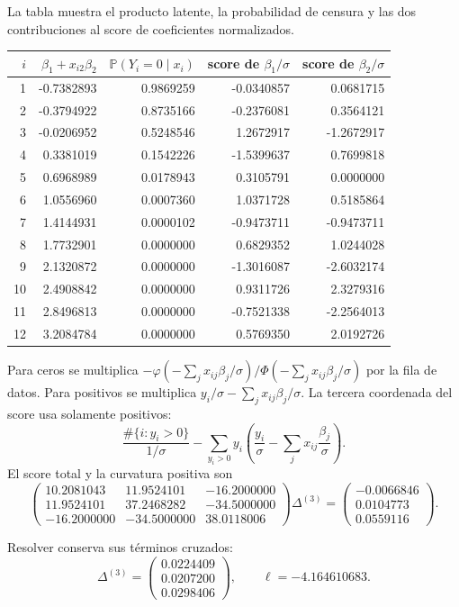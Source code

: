 \documentclass[11pt,a4paper]{article}
\newcommand{\Prob}{\mathbb P}
\begin{document}
La tabla muestra el producto latente,
la probabilidad de censura y
las dos contribuciones al score
de coeficientes normalizados.
\begin{center}\small\begin{tabular}{rrrrr}\toprule
\(i\)&\(\beta_1+x_{i2}\beta_2\)&\(\Prob(Y_i=0\mid x_i)\)&score de \(\beta_1/\sigma\)&score de \(\beta_2/\sigma\)\\\midrule
1&-0.7382893&0.9869259&-0.0340857&0.0681715\\
2&-0.3794922&0.8735166&-0.2376081&0.3564121\\
3&-0.0206952&0.5248546&1.2672917&-1.2672917\\
4&0.3381019&0.1542226&-1.5399637&0.7699818\\
5&0.6968989&0.0178943&0.3105791&0.0000000\\
6&1.0556960&0.0007360&1.0371728&0.5185864\\
7&1.4144931&0.0000102&-0.9473711&-0.9473711\\
8&1.7732901&0.0000000&0.6829352&1.0244028\\
9&2.1320872&0.0000000&-1.3016087&-2.6032174\\
10&2.4908842&0.0000000&0.9311726&2.3279316\\
11&2.8496813&0.0000000&-0.7521338&-2.2564013\\
12&3.2084784&0.0000000&0.5769350&2.0192726\\\bottomrule\end{tabular}\end{center}
Para ceros se multiplica
\(-\varphi(-\sum_jx_{ij}\beta_j/\sigma)/
\Phi(-\sum_jx_{ij}\beta_j/\sigma)\)
por la fila de datos.
Para positivos se multiplica
\(y_i/\sigma-\sum_jx_{ij}\beta_j/\sigma\).
La tercera coordenada del score
usa solamente positivos:
\[
\frac{\#\{i:y_i>0\}}{1/\sigma}
-\sum_{y_i>0}y_i\left(\frac{y_i}{\sigma}
-\sum_jx_{ij}\frac{\beta_j}{\sigma}\right).
\]
El score total y la curvatura positiva son
\[
\begin{pmatrix}10.2081043&11.9524101&-16.2000000\\11.9524101&37.2468282&-34.5000000\\-16.2000000&-34.5000000&38.0118006\end{pmatrix}\Delta^{(3)}=\begin{pmatrix}-0.0066846\\0.0104773\\0.0559116\end{pmatrix}.
\]

Resolver conserva sus términos cruzados:
\[
\Delta^{(3)}=\begin{pmatrix}0.0224409\\0.0207200\\0.0298406\end{pmatrix},\qquad\ell=-4.164610683.
\]
\end{document}
